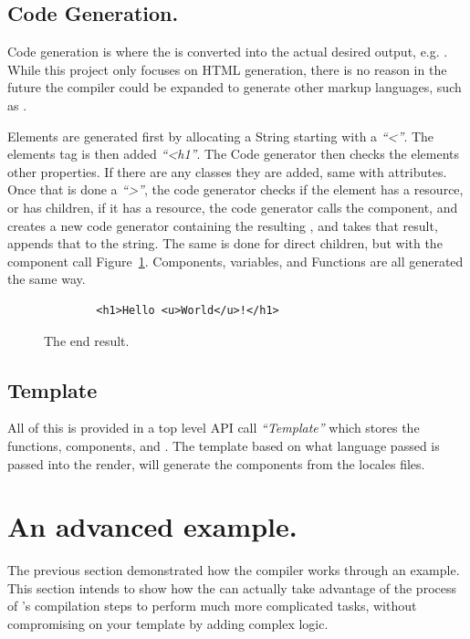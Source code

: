 \subsection{Code Generation.}

Code generation is where the  is converted into the actual desired output, e.g. . While this project only focuses on HTML generation, there is no reason in the future the compiler could be expanded to generate other markup languages, such as . 

Elements are generated first by allocating a String starting with a \textit{``<''}. The elements tag is then added \textit{``<h1''}. The Code generator then checks the elements other properties. If there are any classes they are added, same with attributes. Once that is done a \textit{``>''}, the code generator checks if the element has a resource, or has children, if it has a resource, the code generator calls the component, and creates a new code generator containing the resulting , and takes that result, appends that to the string. The same is done for direct children, but with the component call Figure~\ref{fig:result}. Components, variables, and Functions are all generated the same way.

\begin{figure}[!htbp]
    \begin{verbatim}
        <h1>Hello <u>World</u>!</h1>
    \end{verbatim}
    \caption{The end result.}
    \label{fig:result}
\end{figure}

\subsection{Template}
All of this is provided in a top level API call \textit{``Template''} which stores the functions, components, and . The template based on what language passed is passed into the render, will generate the components from the locales files.
\newpage
\section{An advanced example.}
The previous section demonstrated how the compiler works through an example. This section intends to show how the \you{} can actually take advantage of the process of \languageName{}'s compilation steps to perform much more complicated tasks, without compromising on your template by adding complex logic.


